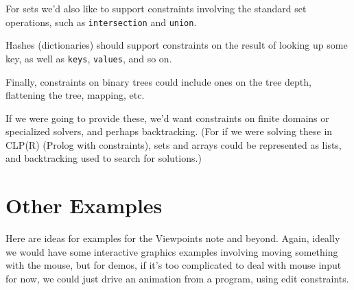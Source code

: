 \documentclass[11pt]{article}
\begin{document}
For sets we'd also like to support constraints involving the standard
set operations, such as \lstinline{intersection} and
\lstinline{union}.

Hashes (dictionaries) should support constraints on the result of looking up
some key, as well as \lstinline{keys}, \lstinline{values}, and so on.

Finally, constraints on binary trees could include ones on the tree
depth, flattening the tree, mapping, etc.

If we were going to provide these, we'd want constraints on finite
domains or specialized solvers, and perhaps backtracking.  (For if we
were solving these in CLP(R) (Prolog with constraints), sets and
arrays could be represented as lists, and backtracking used to search
for solutions.)

\section{Other Examples}
\label{sec:examples}

Here are ideas for examples for the Viewpoints note and beyond.
Again, ideally we would have some interactive graphics examples
involving moving something with the mouse, but for demos, if it's too
complicated to deal with mouse input for now, we could just drive an
animation from a program, using edit constraints.
\end{document}
